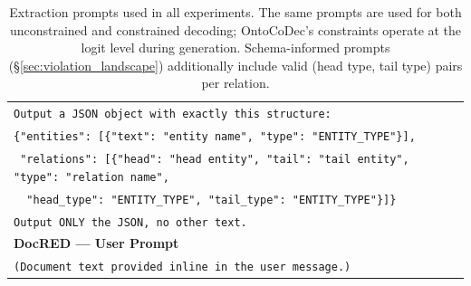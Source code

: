 \begin{table}[t]
\begin{tabular}{@{}p{}@{}}
\texttt{Output a JSON object with exactly this structure:} \\
\texttt{\{"entities": [\{"text": "entity name", "type": "ENTITY\_TYPE"\}],} \\
\texttt{\ "relations": [\{"head": "head entity", "tail": "tail entity", "type": "relation name",} \\
\texttt{\ \ "head\_type": "ENTITY\_TYPE", "tail\_type": "ENTITY\_TYPE"\}]\}} \\[4pt]
\texttt{Output ONLY the JSON, no other text.} \\
\midrule
\textbf{DocRED --- User Prompt} \\
\midrule
\texttt{(Document text provided inline in the user message.)} \\
\bottomrule
\end{tabular}
\caption{Extraction prompts used in all experiments.
The same prompts are used for both unconstrained and constrained decoding; OntoCoDec's constraints operate at the logit level during generation.
Schema-informed prompts (\S\ref{sec:violation_landscape}) additionally include valid (head type, tail type) pairs per relation.}
\label{tab:prompts}
\end{table}
